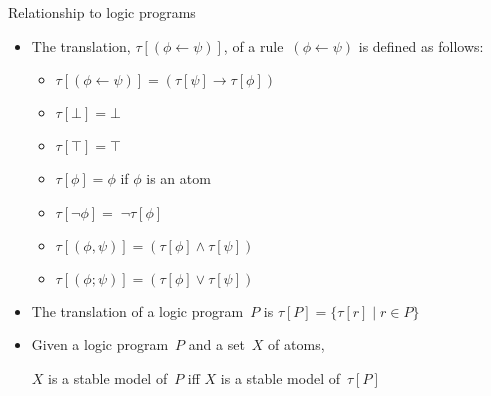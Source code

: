 \begin{frame}{Relationship to logic programs}
\bigskip
\begin{itemize}
\item<1->
  The translation, $\tau[(\phi\leftarrow \psi)]$, of a rule~$(\phi\leftarrow \psi)$
  is defined as follows:%
  \pause[2]
  \begin{itemize}
  \item $\tau[(\phi\leftarrow \psi)]=(\tau[\psi]\rightarrow\tau[\phi])$
  \item $\tau[\bot]=\bot$
  \item $\tau[\top]=\top$
  \item $\tau[\phi]=\phi$ \qquad if $\phi$ is an atom
  \item $\tau[{\neg \phi}]=\;{\neg \tau[\phi]}$
  \item $\tau[(\phi,\psi)]=(\tau[\phi]\wedge\tau[\psi])$
  \item $\tau[(\phi;\psi)]=(\tau[\phi]\vee\tau[\psi])$
  \end{itemize}
\smallskip
\item <3-> The translation of a logic program~$P$ is $\tau[P]=\{\tau[r]\mid r\in P\}$
\medskip
\item <4-> Given a logic program~$P$ and a set~$X$ of atoms,

  $X$ is a stable model of~$P$
  iff
  $X$ is a stable model of~$\tau[P]$
\end{itemize}

\end{frame}
